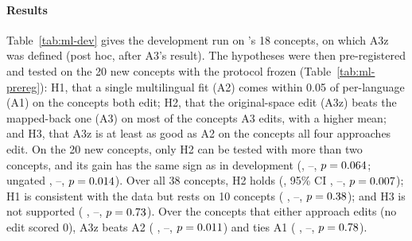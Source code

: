 \paragraph{Results}
Table~\ref{tab:ml-dev} gives the development run on \ember{}'s 18 concepts, on which A3z was defined (post hoc, after A3's result).
The hypotheses were then pre-registered and tested on the 20 new concepts with the protocol frozen (Table~\ref{tab:ml-prereg}): H1, that a single multilingual \ember{} fit (A2) comes within 0.05 of per-language \ember{} (A1) on the concepts both edit; H2, that the original-space edit (A3z) beats the mapped-back one (A3) on most of the concepts A3 edits, with a higher mean; and H3, that A3z is at least as good as A2 on the concepts all four approaches edit.
On the 20 new concepts, only H2 can be tested with more than two concepts, and its gain has the same sign as in development (, --, $p = 0.064$; ungated , --, $p = 0.014$).
Over all 38 concepts, H2 holds (, 95\% CI \expnum{$[+0.054, +0.268]$}, --, $p = 0.007$); H1 is consistent with the data but rests on 10 concepts ( \expnum{$[-0.156, +0.057]$}, --, $p = 0.38$); and H3 is not supported ( \expnum{$[-0.22, +0.17]$}, --, $p = 0.73$).
Over the concepts that either approach edits (no edit scored 0), A3z beats A2 ( \expnum{$[+0.053, +0.366]$}, --, $p = 0.011$) and ties A1 ( \expnum{$[-0.156, +0.110]$}, --, $p = 0.78$).

